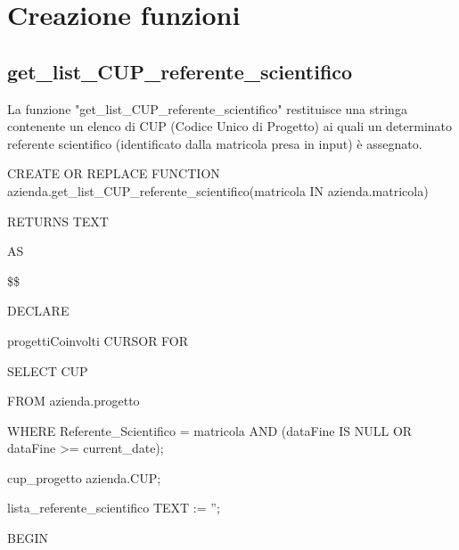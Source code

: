 \newpage

    \section{Creazione funzioni}
                
        \subsection{get\_list\_CUP\_referente\_scientifico}
        La funzione "get\_list\_CUP\_referente\_scientifico" restituisce una stringa contenente un elenco di CUP (Codice Unico di Progetto) ai quali un determinato referente scientifico (identificato dalla matricola presa in input) è assegnato.
            \ttfamily
                \begin{flushleft}
                    \begin{description}
                        \item CREATE OR REPLACE FUNCTION azienda.get\_list\_CUP\_referente\_scientifico(matricola IN azienda.matricola) 
                        \item RETURNS TEXT      
                        \item AS
                        \item \$\$
                        \item DECLARE
                        \begin{description}
                            \item progettiCoinvolti CURSOR FOR
                            \begin{description}
                                \item SELECT CUP
                                \item FROM azienda.progetto
                                \item WHERE Referente\_Scientifico = matricola AND (dataFine IS NULL OR dataFine >= current\_date);
                            \end{description}
                            \item cup\_progetto azienda.CUP;
                            \item lista\_referente\_scientifico TEXT := '';
                        \end{description}
                        \item BEGIN 
                            \begin{description}

\end{description}
\end{description}
\end{flushleft}
